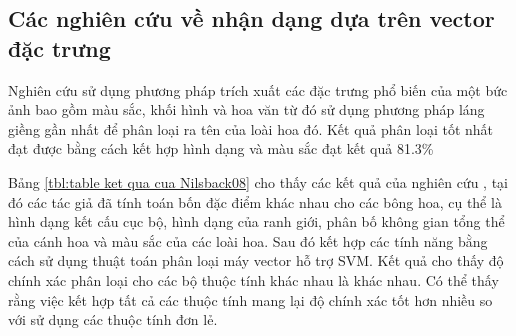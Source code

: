 \documentclass[12pt]{report}
\begin{document}
		\subsection{Các nghiên cứu về nhận dạng dựa trên vector đặc trưng}
																																																
																																																
		Nghiên cứu \cite{cia-Nilsback06} sử dụng phương pháp trích xuất các đặc trưng phổ biến của một bức ảnh bao gồm màu sắc, khối hình và hoa văn từ đó sử dụng phương pháp láng giềng gần nhất để phân loại ra tên của loài hoa đó. Kết quả phân loại tốt nhất đạt được bằng cách kết hợp hình dạng và màu sắc đạt kết quả 81.3\%
																																																
		Bảng \ref{tbl:table ket qua cua Nilsback08} cho thấy các kết quả của nghiên cứu \cite{cia-Nilsback08}, tại đó các tác giả đã tính toán bốn đặc điểm khác nhau cho các bông hoa, cụ thể là hình dạng kết cấu cục bộ, hình dạng của ranh giới, phân bố không gian tổng thể của cánh hoa và màu sắc của các loài hoa. Sau đó kết hợp các tính năng bằng cách sử dụng thuật toán phân loại máy vector hỗ trợ SVM. Kết quả cho thấy độ chính xác phân loại cho các bộ thuộc tính khác nhau là khác nhau. Có thể thấy rằng việc kết hợp tất cả các thuộc tính mang lại độ chính xác tốt hơn nhiều so với sử dụng các thuộc tính đơn lẻ.
																																												
\end{document}
